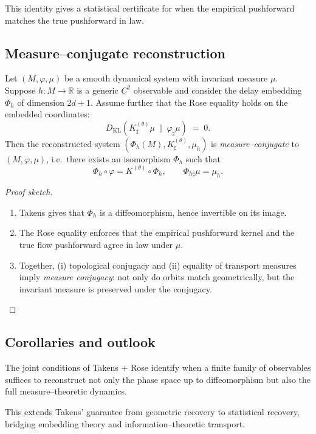 This identity gives a statistical certificate for when the empirical
pushforward matches the true pushforward in law.

\subsection{Measure–conjugate reconstruction}
\label{subsec:measure_conjugacy}
\begin{theorem}[Takens $\,+\,$ Rose = Measure–Conjugacy]
\label{thm:measure_conjugacy}
Let $(M,\varphi,\mu)$ be a smooth dynamical system with invariant
measure $\mu$.  
Suppose $h:M\to\mathbb R$ is a generic $C^2$ observable and consider
the delay embedding $\Phi_h$ of dimension $2d+1$.  
Assume further that the Rose equality holds on the embedded coordinates:
\[
   D_{\mathrm{KL}}\!\left(
      K^{(\theta)}_\sharp \mu
      \,\big\|\, 
      \varphi_\sharp \mu
   \right) \;=\; 0.
\]
Then the reconstructed system $(\Phi_h(M),K^{(\theta)}_\sharp,\mu_h)$
is \emph{measure–conjugate} to $(M,\varphi,\mu)$, i.e.\ there exists
an isomorphism $\Phi_h$ such that
\[
   \Phi_h \circ \varphi = K^{(\theta)} \circ \Phi_h,
   \qquad
   \Phi_{h\sharp}\mu = \mu_h.
\]
\end{theorem}

\begin{proof}[Proof sketch]
\begin{enumerate}
  \item Takens gives that $\Phi_h$ is a diffeomorphism, hence invertible
        on its image.
  \item The Rose equality enforces that the empirical pushforward kernel
        and the true flow pushforward agree in law under $\mu$.
  \item Together, (i) topological conjugacy and (ii) equality of transport
        measures imply \emph{measure conjugacy}: not only do orbits match
        geometrically, but the invariant measure is preserved under the
        conjugacy.
\end{enumerate}
\end{proof}

\subsection{Corollaries and outlook}
\begin{corollary}
The joint conditions of Takens + Rose identify when a finite family of
observables suffices to reconstruct not only the phase space up to
diffeomorphism but also the full measure–theoretic dynamics.
\end{corollary}

\noindent
This extends Takens’ guarantee from geometric recovery to statistical
recovery, bridging embedding theory and information–theoretic transport.


